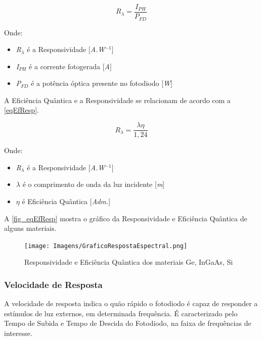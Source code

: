 \begin{equation}
    \label{eq_responsividade}
    R_\lambda = \frac{I_{PH}}{P_{FD}}
\end{equation}

Onde:
\begin{itemize}
    \item \textit{R$_\lambda$} \'e a Responsividade [\textit{A.W$^{-1}$}]
    \item \textit{I$_{PH}$} \'e a corrente fotogerada [\textit{A}]
    \item \textit{P$_{FD}$} \'e a potência \'optica presente no fotodiodo [\textit{W}]
\end{itemize}

A Eficiência Quântica e a Responsividade se relacionam de acordo com a \autoref{eqEfResp}.

\begin{equation}
    \label{eqEfResp}
    R_\lambda = \frac{\lambda\eta}{1,24}
\end{equation}

Onde:
\begin{itemize}
    \item \textit{R$_\lambda$} \'e a Responsividade [\textit{A.W$^{-1}$}]
    \item $\lambda$ \'e o comprimento de onda da luz incidente [\textit{m}]
    \item $\eta$ \'e Efici\^encia Qu\^antica [\textit{Adm.}]
\end{itemize}

A \autoref{fig_eqEfResp} mostra o gráfico da Responsividade e Efici\^encia Qu\^antica de alguns materiais.

\begin{figure}[!h]
	\caption{\label{fig_responsividade}Responsividade e Efici\^encia Qu\^antica dos materiais Ge, InGaAs, Si}
	\begin{center}
	    \texttt{[image: Imagens/GraficoRespostaEspectral.png]}
	\end{center}
	\label{fig_eqEfResp}
\end{figure}


\subsubsection{Velocidade de Resposta}
A velocidade de resposta indica o quão rápido o fotodiodo \'e capaz de responder a estímulos de luz externos, em determinada frequência. É caracterizado pelo Tempo de Subida e Tempo de Descida do Fotodiodo, na faixa de frequências de interesse.

